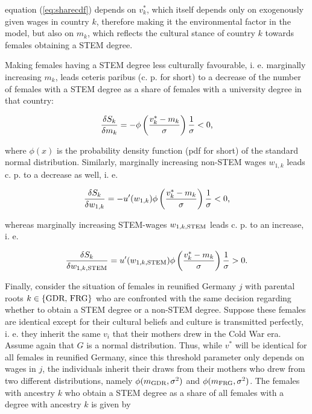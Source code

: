 \documentclass[a4paper, oneside, hyperfootnotes = false]{article}
\begin{document}
{\noindent equation (\ref{eq:sharecdf}) depends on $v^{*}_{k}$, which itself depends only on exogenously given wages in country $k$, therefore making it the environmental factor in the model, but also on $m_{k}$, which reflects the cultural stance of country $k$ towards females obtaining a STEM degree.

Making females having a STEM degree less culturally favourable, i. e. marginally increasing $m_{k}$, leads ceteris paribus (c. p. for short) to a decrease of the number of females with a STEM degree as a share of females with a university degree in that country:

\vspace{-8mm}

\begin{equation*}
	\label{eq:derivmk}
	\frac{\delta{}S_{k}}{\delta{}m_{k}} = -\phi\left(\frac{v^{*}_{k} - m_{k}}{\sigma}\right)\frac{1}{\sigma} < 0\textnormal{,}
\end{equation*}

\noindent where $\phi(x)$ is the probability density function (pdf for short) of the standard normal distribution. Similarly, marginally increasing non-STEM wages $w_{1,k}$ leads c. p. to a decrease as well, i. e.

\vspace{-8mm}

\begin{equation*}
\label{eq:derivw1k}
\frac{\delta{}S_{k}}{\delta{}w_{1,k}} = -u'(w_{1,k})\phi\left(\frac{v^{*}_{k} - m_{k}}{\sigma}\right)\frac{1}{\sigma} < 0\textnormal{,}
\end{equation*}

\noindent whereas marginally increasing STEM-wages $w_{1,k,\textnormal{STEM}}$ leads c. p. to an increase, i. e.

\vspace{-8mm}

\begin{equation*}
	\label{eq:derivw1kstem}
	\frac{\delta{}S_{k}}{\delta{}w_{1,k,\textnormal{STEM}}} = u'(w_{1,k,\textnormal{STEM}})\phi\left(\frac{v^{*}_{k} - m_{k}}{\sigma}\right)\frac{1}{\sigma} > 0\textnormal{.}
\end{equation*}

Finally, consider the situation of females in reunified Germany $j$ with parental roots $k \in \{\textnormal{GDR, FRG}\}$ who are confronted with the same decision regarding whether to obtain a STEM degree or a non-STEM degree. Suppose these females are identical except for their cultural beliefs and culture is transmitted perfectly, i. e. they inherit the same $v_{i}$ that their mothers drew in the Cold War era.
Assume again that $G$ is a normal distribution.
Thus, while $v^{*}$ will be identical for all females in reunified Germany, since this threshold parameter only depends on wages in $j$, the individuals inherit their draws from their mothers who drew from two different distributions, namely $\phi(m_{\textnormal{GDR}},\sigma^{2})$ and $\phi(m_{\textnormal{FRG}},\sigma^{2})$.
The females with ancestry $k$ who obtain a STEM degree as a share of all females with a degree with ancestry $k$ is given by

}
\end{document}
